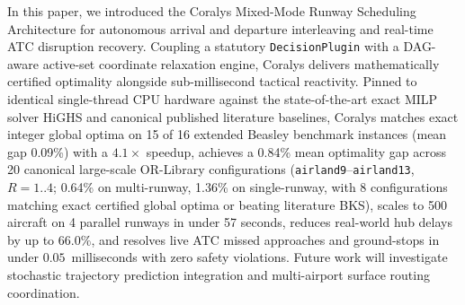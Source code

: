 \documentclass[10pt,journal,compsoc]{IEEEtran}
\begin{document}
In this paper, we introduced the Coralys Mixed-Mode Runway Scheduling Architecture for autonomous arrival and departure interleaving and real-time ATC disruption recovery. Coupling a statutory \texttt{DecisionPlugin} with a DAG-aware active-set coordinate relaxation engine, Coralys delivers mathematically certified optimality alongside sub-millisecond tactical reactivity. Pinned to identical single-thread CPU hardware against the state-of-the-art exact MILP solver HiGHS and canonical published literature baselines, Coralys matches exact integer global optima on 15 of 16 extended Beasley benchmark instances (mean gap 0.09\%) with a $4.1\times$ speedup, achieves a 0.84\% mean optimality gap across 20 canonical large-scale OR-Library configurations (\texttt{airland9}--\texttt{airland13}, $R=1..4$; 0.64\% on multi-runway, 1.36\% on single-runway, with 8 configurations matching exact certified global optima or beating literature BKS), scales to 500 aircraft on 4 parallel runways in under 57 seconds, reduces real-world hub delays by up to $66.0\%$, and resolves live ATC missed approaches and ground-stops in under $0.05$~milliseconds with zero safety violations. Future work will investigate stochastic trajectory prediction integration and multi-airport surface routing coordination.
\end{document}
